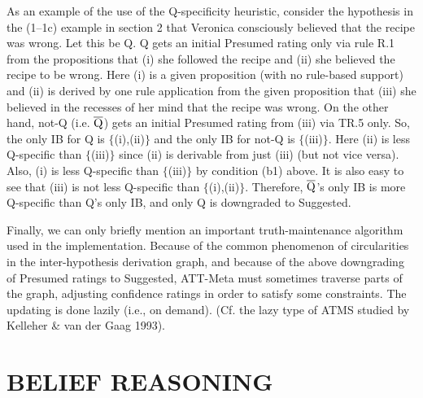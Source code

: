 As an example of the use of the Q-specificity heuristic, consider the
hypothesis in the (1--1c) example in section 2 that 
%
%
Veronica consciously believed that the recipe was wrong. 
%
Let this be Q. Q gets an initial
Presumed rating only via rule R.1 from the propositions that (i) she followed
the recipe and (ii) she believed the recipe to be wrong. Here (i) is a given
proposition (with no rule-based support) and (ii) is derived by one rule
application from the given proposition that (iii) she believed in the recesses
of her mind that the recipe was wrong. On the other hand, not-Q (i.e.
$\overline{{\rm Q}}$) gets an initial Presumed rating from (iii) via TR.5 only.
So, the only IB for Q is $\{$(i),(ii)$\}$ and the only IB for not-Q is
$\{$(iii)$\}$.  Here (ii) is less Q-specific than $\{$(iii)$\}$ since (ii) is
derivable from just (iii) (but not vice versa). Also, (i) is less Q-specific
than $\{$(iii)$\}$ by condition (b1) above. It is also easy to see that (iii)
is not less Q-specific than $\{$(i),(ii)$\}$.  Therefore, $\overline{{\rm
Q}}$'s only IB is more Q-specific than Q's only IB, and only Q is downgraded to
Suggested.

Finally, we can only briefly mention an important truth-maintenance algorithm
used in the implementation.  Because of the common phenomenon of circularities
in the inter-hypothesis derivation graph, and because of the above downgrading
of Presumed ratings to Suggested, ATT-Meta must sometimes traverse parts of the
graph, adjusting confidence ratings in order to satisfy some constraints. The
updating is done lazily (i.e., on demand). (Cf. the lazy type of ATMS studied
by Kelleher \& van der Gaag 1993).


\section{BELIEF REASONING} %


